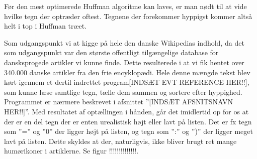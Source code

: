 

Før den mest optimerede Huffman algoritme kan laves, er man nødt til at vide hvilke tegn der optræder oftest. Tegnene der forekommer hyppigst kommer altså helt i top i Huffman træet.

Som udgangspunkt vi at kigge på hele den danske Wikipedias indhold, da det som udgangspunkt var den største offentligt tilgængelige database for dansksprogede artikler vi kunne finde. Dette resulterede i at vi fik hentet over 340.000 danske artikler fra den frie encyklopædi. Hele denne mængde tekst blev kørt igennem et dertil indrettet program[INDSÆT EVT REFERENCE HER!!], som kunne læse samtlige tegn, tælle dem sammen og sortere efter hyppighed. Programmet er nærmere beskrevet i afsnittet ”[INDSÆT AFSNITSNAVN HER!!]”.  Med resultatet af optællingen i hånden, går det imidlertid op for os at der er en del tegn der er enten urealistisk højt eller lavt på listen. Det er fx tegn som ”=” og ”0” der ligger højt på listen, og tegn som ”:” og ”)” der ligger meget lavt på listen. Dette skyldes at der, naturligvis, ikke bliver brugt ret mange humørikoner i artiklerne. Se figur !!!!!!!!!!!!!!.



